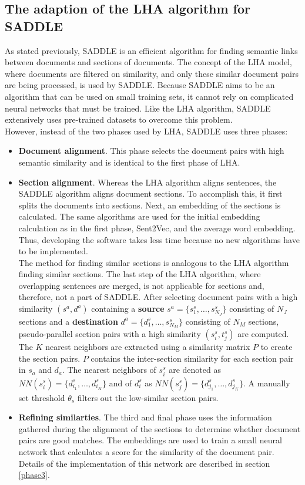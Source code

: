 \subsection{The adaption of the LHA algorithm for SADDLE}
\label{secSADDLE}
As stated previously, SADDLE is an efficient algorithm for finding semantic links between documents and sections of documents. The concept of the LHA model, where documents are filtered on similarity, and only these similar document pairs are being processed, is used by SADDLE. Because SADDLE aims to be an algorithm that can be used on small training sets, it cannot rely on complicated neural networks that must be trained. Like the LHA algorithm, SADDLE extensively uses pre-trained datasets to overcome this problem.\\
However, instead of the two phases used by LHA, SADDLE uses three phases:
\begin{itemize}
  \item{\textbf{Document alignment}}. This phase selects the document pairs with high semantic similarity and is identical to the first phase of LHA.
  \item{\textbf{Section alignment}}. Whereas the LHA algorithm aligns sentences, the SADDLE algorithm aligns document sections. To accomplish this, it first splits the documents into sections. Next, an embedding of the sections is calculated. The same algorithms are used for the initial embedding calculation as in the first phase, Sent2Vec, and the average word embedding. Thus, developing the software takes less time because no new algorithms have to be implemented. \\
The method for finding similar sections is analogous to the LHA algorithm finding similar sections. The last step of the LHA algorithm, where overlapping sentences are merged, is not applicable for sections and, therefore, not a part of SADDLE.
After selecting document pairs with a high similarity $(s^a, d^a)$ containing a \textbf{source} $s^a = \{s^s_1, \ldots, s^s_{N_J}\}$ consisting of $N_J$ sections and a \textbf{destination} $d^a = \{d^s_1, \ldots, s^s_{N_M}\}$ consisting of $N_M$ sections, pseudo-parallel section pairs with a high similarity $(s^s_i, t^s_j)$ are computed.  The $K$ nearest neighbors are extracted using a similarity matrix $P$ to create the section pairs. $P$ contains the inter-section similarity for each section pair in $s_a$ and $d_a$. The nearest neighbors of $s^s_i$ are denoted as $NN(s^s_i) = \{d^s_{i_1}, \ldots,d^s_{i_K}\}$ and of $d^s_i$ as $NN(s^s_j) = \{d^s_{j_1}, \ldots,d^s_{j_K}\}$. A manually set threshold $\theta_s$ filters out the low-similar section pairs. 
  \item{\textbf{Refining similarties}}. The third and final phase uses the information gathered during the alignment of the sections to determine whether document pairs are good matches. The embeddings are used to train a small neural network that calculates a score for the similarity of the document pair. Details of the implementation of this network are described in section \ref{phase3}.\\
\end{itemize}

